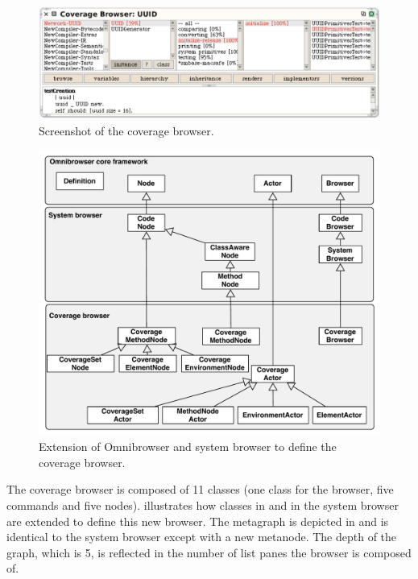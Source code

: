 \documentclass[a4paper,10pt,twoside]{book}
\begin{document}
\begin{figure}[!ht]
\begin{center}
\includegraphics[scale=0.44]{coverageBrowserScreenshot.pdf}
\caption{Screenshot of the coverage browser.} 
\end{center}
\end{figure}

\begin{figure}[!ht]
\begin{center}
\includegraphics[scale=0.55]{coverageBrowser.pdf}
\caption{Extension of Omnibrowser and system browser to define the coverage browser.} 
\end{center}
\end{figure}

The coverage browser is composed of 11 classes (one class for the browser, five commands and five nodes).  illustrates how classes in \ob and in the system browser are extended to define this new browser. The metagraph is depicted in  and is identical to the system browser except with a new  metanode. The depth of the graph, which is 5, is reflected in the number of list panes the browser is composed of.
\end{document}
